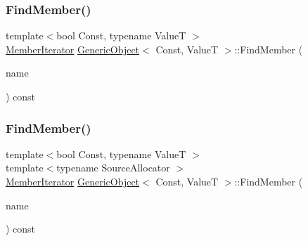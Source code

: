 \mbox{\label{classGenericObject_a979890ccb3b116af19f9e3e77d3d286f}} 
\subsubsection{\texorpdfstring{Find\+Member()}{FindMember()}\hspace{0.1cm}{\footnotesize\ttfamily [1/2]}}
{\footnotesize\ttfamily template$<$bool Const, typename ValueT $>$ \\
\hyperlink{classGenericObject_a1f531d70f8d57ed30199ac445b5935e6}{Member\+Iterator} \hyperlink{classGenericObject}{Generic\+Object}$<$ Const, ValueT $>$\+::Find\+Member (\begin{DoxyParamCaption}\item[{\hyperlink{classGenericObject_af70c9646b5e422306c33e98b3d8783a7}{const} \hyperlink{classGenericObject_ac6747e5baa13e15bcea1658b5624647a}{Ch} $\ast$}]{name }\end{DoxyParamCaption}) const\hspace{0.3cm}{\ttfamily [inline]}}

\mbox{\label{classGenericObject_a12a4fbbf2219d6bb43c3d61923830ab4}} 
\subsubsection{\texorpdfstring{Find\+Member()}{FindMember()}\hspace{0.1cm}{\footnotesize\ttfamily [2/2]}}
{\footnotesize\ttfamily template$<$bool Const, typename ValueT $>$ \\
template$<$typename Source\+Allocator $>$ \\
\hyperlink{classGenericObject_a1f531d70f8d57ed30199ac445b5935e6}{Member\+Iterator} \hyperlink{classGenericObject}{Generic\+Object}$<$ Const, ValueT $>$\+::Find\+Member (\begin{DoxyParamCaption}\item[{\hyperlink{classGenericObject_af70c9646b5e422306c33e98b3d8783a7}{const} \hyperlink{classGenericValue}{Generic\+Value}$<$ \hyperlink{classGenericObject_a96ebfdde095e2ce42535d15ae5dc58ef}{Encoding\+Type}, Source\+Allocator $>$ \&}]{name }\end{DoxyParamCaption}) const\hspace{0.3cm}{\ttfamily [inline]}}

